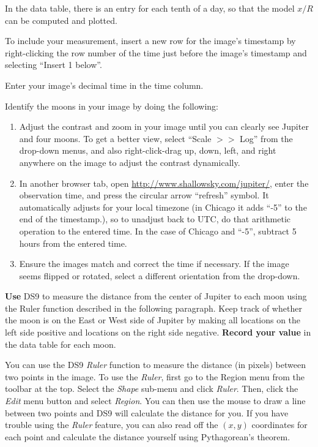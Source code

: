 In the data table, there is an entry for each tenth of a day, so that the model $x/R$ can be computed and plotted.

\begin{steps}
	\item To include your measurement, insert a new row for the image's timestamp by right-clicking the row number of the time just before the image's timestamp and selecting ``Insert 1 below''.
	
	\item Enter your image's decimal time in the time column.

	\item Identify the moons in your image by doing the following:
	\begin{enumerate}
		\item Adjust the contrast and zoom in your image until you can clearly see Jupiter and four moons. To get a better view, select ``Scale $>>$ Log'' from the drop-down menus, and also right-click-drag up, down, left, and right anywhere on the image to adjust the contrast dynamically.
		
		\item In another browser tab, open \url{http://www.shallowsky.com/jupiter/}, enter the observation time, and press the circular arrow ``refresh'' symbol. It automatically adjusts for your local timezone (in Chicago it adds ``-5'' to the end of the timestamp.), so to unadjust back to UTC, do that arithmetic operation to the entered time. In the case of Chicago and ``-5'', subtract 5 hours from the entered time.
		
		\item Ensure the images match and correct the time if necessary. If the image seems flipped or rotated, select a different orientation from the drop-down.
	\end{enumerate}
	
	\item \textbf{Use} DS9 to measure the distance from the center of Jupiter to each moon using the Ruler function described in the following paragraph. Keep track of whether the moon is on the East or West side of Jupiter by making all locations on the left side positive and locations on the right side negative. \textbf{Record your value} in the data table for each moon.
\end{steps}

You can use the DS9 \textit{Ruler} function to measure the distance (in pixels) between two points in the image. To use the \textit{Ruler}, first go to the Region menu from the toolbar at the top. Select the \textit{Shape} sub-menu and click \textit{Ruler}. Then, click the \textit{Edit} menu button and select \textit{Region}. You can then use the mouse to draw a line between two points and DS9 will calculate the distance for you. If you have trouble using the \textit{Ruler} feature, you can also read off the $(x,y)$ coordinates for each point and calculate the distance yourself using Pythagorean's theorem.

